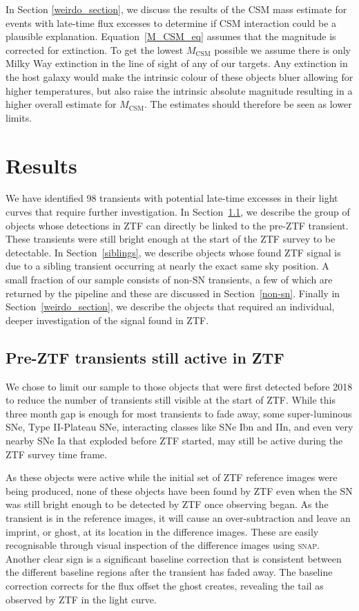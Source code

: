 \documentclass[a4paper,oneside,12pt, class=Latex/Classes/PhDthesisPSnPDF, crop=false]{standalone}
\begin{document}
In Section \ref{weirdo_section}, we discuss the results of the CSM mass estimate for events with late-time flux excesses to determine if CSM interaction could be a plausible explanation. Equation~\ref{M_CSM_eq} assumes that the magnitude is corrected for extinction. To get the lowest $M_\text{CSM}$ possible we assume there is only Milky Way extinction in the line of sight of any of our targets. Any extinction in the host galaxy would make the intrinsic colour of these objects bluer allowing for higher temperatures, but also raise the intrinsic absolute magnitude resulting in a higher overall estimate for $M_\text{CSM}$. The estimates should therefore be seen as lower limits.


\section{Results}
\label{Pre-ZTF_results}

We have identified 98 transients with potential late-time excesses in their light curves that require further investigation. In Section~\ref{tails}, we describe the group of objects whose detections in ZTF can directly be linked to the pre-ZTF transient. These transients were still bright enough at the start of the ZTF survey to be detectable. In Section~\ref{siblings}, we describe objects whose found ZTF signal is due to a sibling transient occurring at nearly the exact same sky position. A small fraction of our sample consists of non-SN transients, a few of which are returned by the pipeline and these are discussed in Section~\ref{non-sn}. Finally in Section~\ref{weirdo_section}, we describe the objects that required an individual, deeper investigation of the signal found in ZTF.


\subsection{Pre-ZTF transients still active in ZTF}
\label{tails}

We chose to limit our sample to those objects that were first detected before 2018 to reduce the number of transients still visible at the start of ZTF. While this three month gap is enough for most transients to fade away, some super-luminous SNe, Type II-Plateau SNe, interacting classes like SNe Ibn and IIn, and even very nearby SNe Ia that exploded before ZTF started, may still be active during the ZTF survey time frame.

As these objects were active while the initial set of ZTF reference images were being produced, none of these objects have been found by ZTF even when the SN was still bright enough to be detected by ZTF once observing began. As the transient is in the reference images, it will cause an over-subtraction and leave an imprint, or ghost, at its location in the difference images. These are easily recognisable through visual inspection of the difference images using \textsc{snap}. Another clear sign is a significant baseline correction that is consistent between the different baseline regions after the transient has faded away. The baseline correction corrects for the flux offset the ghost creates, revealing the tail as observed by ZTF in the light curve.
\end{document}
